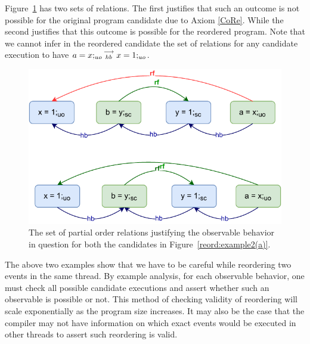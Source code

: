         Figure~\ref{reord:example2(b)} has two sets of relations. 
        The first justifies that such an outcome is not possible for the original program candidate due to Axiom \ref{CoRe}. 
        While the second justifies that this outcome is possible for the reordered program.
        Note that we cannot infer in the reordered candidate the set of relations for any candidate execution to have $a=x;_{uo}\stackrel{\longrightarrow}{_{hb}}x=1;_{uo}$. 
        \begin{figure}[H]
            \centering
            \includegraphics[scale=0.7]{5.InstructionReordering/0.Intro/ReorderingExample2(b).pdf}
            \caption{The set of partial order relations justifying the observable behavior in question for both the candidates in Figure~\ref{reord:example2(a)}.} 
            \label{reord:example2(b)}
        \end{figure}

        The above two examples show that we have to be careful while reordering two events in the same thread. 
        By example analysis, for each observable behavior, one must check all possible candidate executions and assert whether such an observable is possible or not. 
        This method of checking validity of reordering will scale exponentially as the program size increases. 
        It may also be the case that the compiler may not have information on which exact events would be executed in other threads to assert such reordering is valid. 

    
    
    
    
    